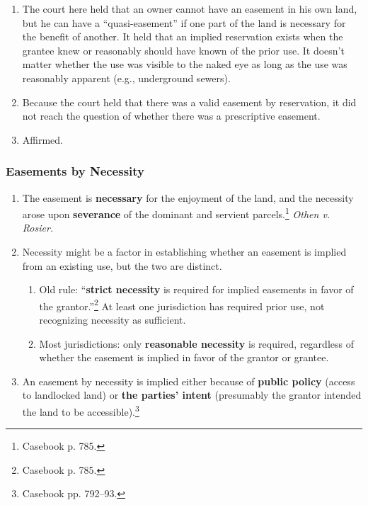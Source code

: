 \begin{enumerate}
    \item The court here held that an owner cannot have an easement in his 
    own land, but he can have a ``quasi-easement'' if one part of the land is 
    necessary for the benefit of another. It held that an implied reservation 
    exists when the grantee knew or reasonably should have known of the prior 
    use. It doesn't matter whether the use was visible to the naked eye as 
    long as the use was reasonably apparent (e.g., underground sewers).
    \item Because the court held that there was a valid easement by 
    reservation, it did not reach the question of whether there was a 
    prescriptive easement.
    \item Affirmed.
\end{enumerate}

\subsubsection{Easements by Necessity}

\begin{enumerate}
    \item The easement is \textbf{necessary} for the enjoyment of the land, 
    and the necessity arose upon \textbf{severance} of the dominant and 
    servient parcels.\footnote{Casebook p. 785.} \emph{Othen v.  Rosier.}
    \item Necessity might be a factor in establishing whether an easement is 
    implied from an existing use, but the two are distinct.
    \begin{enumerate}
        \item Old rule: ``\textbf{strict necessity} is required for implied 
        easements in favor of the grantor.''\footnote{Casebook p. 785.} At 
        least one jurisdiction has required prior use, not recognizing 
        necessity as sufficient.
        \item Most jurisdictions: only \textbf{reasonable necessity} is 
        required, regardless of whether the easement is implied in favor of 
        the grantor or grantee.
    \end{enumerate}
    \item An easement by necessity is implied either because of \textbf{public 
    policy} (access to landlocked land) or \textbf{the parties' intent} 
    (presumably the grantor intended the land to be 
    accessible).\footnote{Casebook pp. 792--93.}
\end{enumerate}

